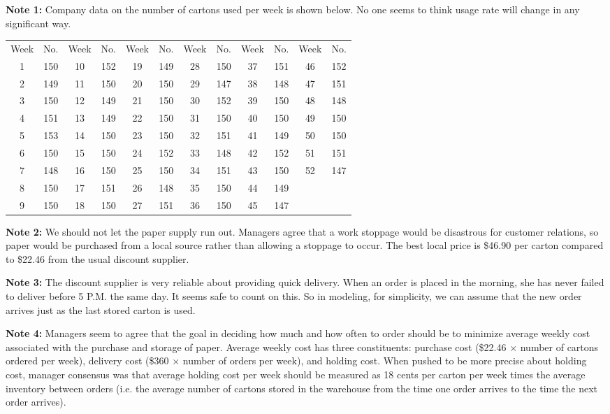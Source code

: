 \documentclass
[justified,nohyper]
{tufte-handout}
\begin{document}
\newpage

\textbf{Note 1:} Company data on the number of cartons used per week is shown below. No one seems to think usage rate will change in any significant way.
\vspace{0.1in}

\begin{tabular}{|c c|c c|c c|c c|c c|c c|}
    \hline
    Week & No. & Week & No. & Week & No. & Week & No. & Week & No. & Week & No. \\
    1 & 150 & 10 & 152 & 19 & 149 & 28 & 150 & 37 & 151 & 46 & 152 \\
    2 & 149 & 11 & 150 & 20 & 150 & 29 & 147 & 38 & 148 & 47 & 151 \\
    3 & 150 & 12 & 149 & 21 & 150 & 30 & 152 & 39 & 150 & 48 & 148 \\
    4 & 151 & 13 & 149 & 22 & 150 & 31 & 150 & 40 & 150 & 49 & 150 \\
    5 & 153 & 14 & 150 & 23 & 150 & 32 & 151 & 41 & 149 & 50 & 150 \\
    6 & 150 & 15 & 150 & 24 & 152 & 33 & 148 & 42 & 152 & 51 & 151 \\
    7 & 148 & 16 & 150 & 25 & 150 & 34 & 151 & 43 & 150 & 52 & 147 \\
    8 & 150 & 17 & 151 & 26 & 148 & 35 & 150 & 44 & 149 &    &     \\
    9 & 150 & 18 & 150 & 27 & 151 & 36 & 150 & 45 & 147 &    &     \\
    \hline
\end{tabular}
\vspace{0.1in}

\textbf{Note 2:} We should not let the paper supply run out. Managers agree that a work stoppage would be disastrous for customer relations, so paper would be purchased from a local source rather than allowing a stoppage to occur. The best local price is \$46.90 per carton compared to \$22.46 from the usual discount supplier.

\textbf{Note 3:} The discount supplier is very reliable about providing quick delivery. When an order is placed in the morning, she has never failed to deliver before 5 P.M. the same day. It seems safe to count on this. So in modeling, for simplicity, we can assume that the new order arrives just as the last stored carton is used.

\textbf{Note 4:} Managers seem to agree that the goal in deciding how much and how often to order should be to minimize average weekly cost associated with the purchase and storage of paper. Average weekly cost has three constituents: purchase cost (\$22.46 $\times$ number of cartons ordered per week), delivery cost (\$360 $\times$ number of orders per week), and holding cost. When pushed to be more precise about holding cost, manager consensus was that average holding cost per week should be measured as 18 cents per carton per week times the average inventory between orders (i.e. the average number of cartons stored in the warehouse from the time one order arrives to the time the next order arrives).
\end{document}

